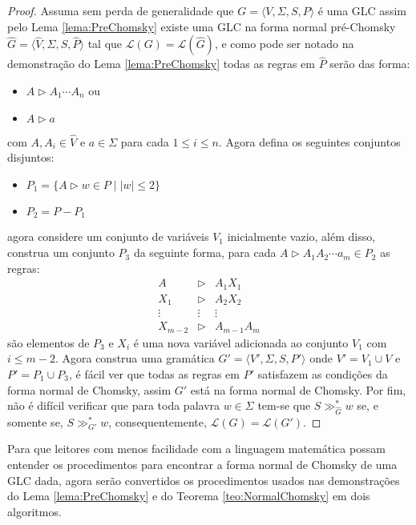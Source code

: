 \begin{proof}
    Assuma sem perda de generalidade que $G = \langle V, \Sigma, S, P \rangle$ é uma GLC assim pelo Lema \ref{lema:PreChomsky} existe uma GLC na forma normal pré-Chomsky $\widehat{G} = \langle \widehat{V}, \Sigma, S, \widehat{P} \rangle$ tal que $\mathcal{L}(G) = \mathcal{L}(\widehat{G})$, e como pode ser notado na demonstração do  Lema \ref{lema:PreChomsky} todas as regras em $\widehat{P}$ serão das forma:
    \begin{itemize}
        \item $A \rhd A_1 \cdots A_n$ ou 
        \item $A \rhd a$
    \end{itemize}
    com $A, A_i \in \widehat{V}$ e $a \in \Sigma$ para cada $1 \leq i \leq n$. Agora defina os seguintes conjuntos disjuntos:
    \begin{itemize}
        \item $P_{1} = \{A \rhd w \in P \mid |w| \leq 2\}$
        \item $P_{2} = P - P_{1}$
    \end{itemize}
    agora considere um conjunto de variáveis $V_1$ inicialmente vazio, além disso,  construa um conjunto $P_3$ da seguinte forma, para cada $A \rhd A_1A_2\cdots a_m \in P_2$ as regras:
    \begin{eqnarray*}
        A & \rhd & A_1X_1\\
        X_1 & \rhd & A_2X_2\\
        \vdots & \vdots & \vdots\\
        X_{m-2} & \rhd & A_{m-1}A_{m}
    \end{eqnarray*}
    são elementos de $P_3$ e $X_i$ é uma nova variável adicionada ao conjunto $V_1$ com $i \leq m-2$. Agora construa uma gramática $G' = \langle V', \Sigma, S, P' \rangle$ onde $V' = V_1 \cup V$ e $P' = P_1 \cup P_3$, é fácil ver que todas as regras em $P'$ satisfazem as condições da forma normal de Chomsky, assim $G'$ está na forma normal de Chomsky. Por fim, não é difícil verificar que para toda palavra $w \in \Sigma$ tem-se que $S \gg^*_{\widehat{G}} w$ se, e somente se, $S \gg^*_{G'} w$,  consequentemente,  $\mathcal{L}(G) = \mathcal{L}(G')$.
\end{proof}

Para que leitores com menos facilidade com a linguagem matemática possam entender os procedimentos para encontrar a forma normal de Chomsky de uma GLC dada, agora serão convertidos os procedimentos usados nas demonstrações do Lema \ref{lema:PreChomsky} e do Teorema \ref{teo:NormalChomsky} em dois algoritmos.

